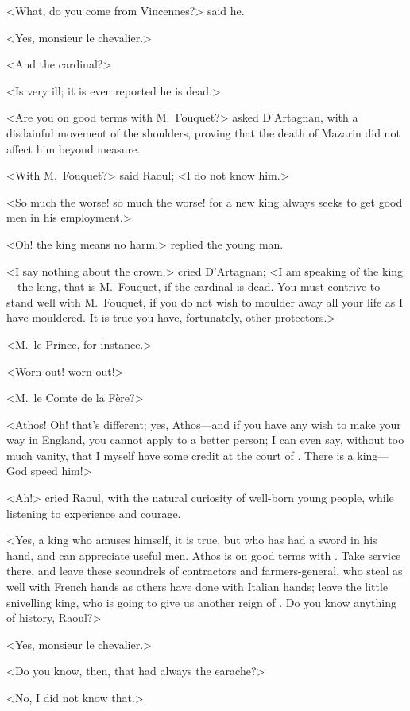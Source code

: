 <What, do you come from Vincennes?> said he.

<Yes, monsieur le chevalier.>

<And the cardinal?>

<Is very ill; it is even reported he is dead.>

<Are you on good terms with M.~Fouquet?> asked D'Artagnan, with a disdainful movement of the shoulders, proving that the death of Mazarin did not affect him beyond measure.

<With M.~Fouquet?> said Raoul; <I do not know him.>

<So much the worse! so much the worse! for a new king always seeks to get good men in his employment.>

<Oh! the king means no harm,> replied the young man.

<I say nothing about the crown,> cried D'Artagnan; <I am speaking of the king—the king, that is M.~Fouquet, if the cardinal is dead. You must contrive to stand well with M.~Fouquet, if you do not wish to moulder away all your life as I have mouldered. It is true you have, fortunately, other protectors.>

<M.~le Prince, for instance.>

<Worn out! worn out!>

<M.~le Comte de la Fère?>

<Athos! Oh! that's different; yes, Athos—and if you have any wish to make your way in England, you cannot apply to a better person; I can even say, without too much vanity, that I myself have some credit at the court of . There is a king—God speed him!>

<Ah!> cried Raoul, with the natural curiosity of well-born young people, while listening to experience and courage.

<Yes, a king who amuses himself, it is true, but who has had a sword in his hand, and can appreciate useful men. Athos is on good terms with . Take service there, and leave these scoundrels of contractors and farmers-general, who steal as well with French hands as others have done with Italian hands; leave the little snivelling king, who is going to give us another reign of \@. Do you know anything of history, Raoul?>

<Yes, monsieur le chevalier.>

<Do you know, then, that  had always the earache?>

<No, I did not know that.>

